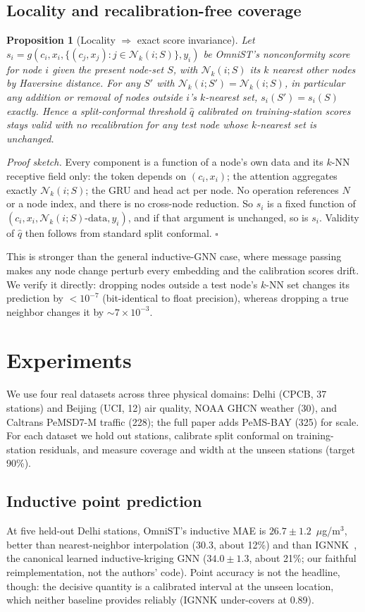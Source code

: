 \documentclass[conference]{IEEEtran}
\newtheorem{proposition}{Proposition}
\begin{document}
\subsection{Locality and recalibration-free coverage}
\begin{proposition}[Locality $\Rightarrow$ exact score invariance]
\label{prop:locality}
Let $s_i=g(c_i,x_i,\{(c_j,x_j):j\in\mathcal{N}_k(i;S)\},y_i)$ be OmniST's nonconformity score for node
$i$ given the present node-set $S$, with $\mathcal{N}_k(i;S)$ its $k$ nearest other nodes by Haversine
distance. For any $S'$ with $\mathcal{N}_k(i;S')=\mathcal{N}_k(i;S)$, in particular any addition or
removal of nodes outside $i$'s $k$-nearest set, $s_i(S')=s_i(S)$ exactly. Hence a split-conformal
threshold $\hat q$ calibrated on training-station scores stays valid with no recalibration for any test
node whose $k$-nearest set is unchanged.
\end{proposition}
\emph{Proof sketch.} Every component is a function of a node's own data and its $k$-NN receptive field
only: the token depends on $(c_i,x_i)$; the attention aggregates exactly $\mathcal{N}_k(i;S)$; the GRU
and head act per node. No operation references $N$ or a node index, and there is no cross-node reduction.
So $s_i$ is a fixed function of $(c_i,x_i,\mathcal{N}_k(i;S)\text{-data},y_i)$, and if that argument is
unchanged, so is $s_i$. Validity of $\hat q$ then follows from standard split conformal. $\square$

This is stronger than the general inductive-GNN case, where message passing makes any node change
perturb every embedding and the calibration scores drift. We verify it directly: dropping nodes outside
a test node's $k$-NN set changes its prediction by $<10^{-7}$ (bit-identical to float precision), whereas
dropping a true neighbor changes it by $\sim 7\times10^{-3}$.

\section{Experiments}
We use four real datasets across three physical domains: Delhi (CPCB, 37 stations) and Beijing (UCI, 12)
air quality, NOAA GHCN weather (30), and Caltrans PeMSD7-M traffic (228); the full paper adds PeMS-BAY
(325) for scale. For each dataset we hold out stations, calibrate split conformal on training-station
residuals, and measure coverage and width at the unseen stations (target 90\%).

\subsection{Inductive point prediction}
At five held-out Delhi stations, OmniST's inductive MAE is $26.7\pm1.2$~$\mu$g/m$^3$, better than
nearest-neighbor interpolation ($30.3$, about 12\%) and than IGNNK~\cite{ignnk2020}, the canonical
learned inductive-kriging GNN ($34.0\pm1.3$, about 21\%; our faithful reimplementation, not the authors'
code). Point accuracy is not the headline, though: the decisive quantity is a calibrated interval at the
unseen location, which neither baseline provides reliably (IGNNK under-covers at 0.89).
\end{document}
